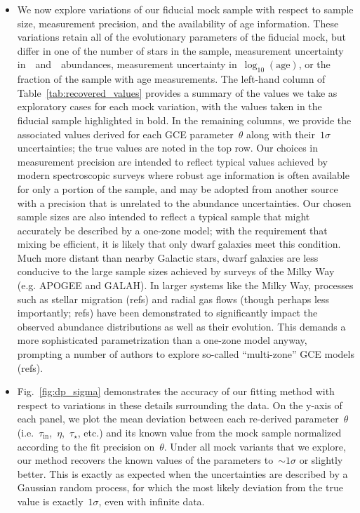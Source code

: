 \documentclass[ms.tex]{subfiles}
\begin{document}
\begin{itemize}

	\item We now explore variations of our fiducial mock sample with respect
	to sample size, measurement precision, and the availability of age
	information.
	These variations retain all of the evolutionary parameters of the fiducial
	mock, but differ in one of the number of stars in the sample, measurement
	uncertainty in~\feh~and~\afe~abundances, measurement uncertainty
	in~$\log_{10}(\text{age})$, or the fraction of the sample with age
	measurements.
	The left-hand column of Table~\ref{tab:recovered_values} provides a summary
	of the values we take as exploratory cases for each mock variation, with
	the values taken in the fiducial sample highlighted in bold.
	In the remaining columns, we provide the associated values derived for each
	GCE parameter~$\theta$ along with their~$1\sigma$ uncertainties; the true
	values are noted in the top row.
	Our choices in measurement precision are intended to reflect typical values
	achieved by modern spectroscopic surveys where robust age information is
	often available for only a portion of the sample, and may be adopted from
	another source with a precision that is unrelated to the abundance
	uncertainties.
	Our chosen sample sizes are also intended to reflect a typical sample that
	might accurately be described by a one-zone model; with the requirement
	that mixing be efficient, it is likely that only dwarf galaxies meet this
	condition.
	Much more distant than nearby Galactic stars, dwarf galaxies are less
	conducive to the large sample sizes achieved by surveys of the Milky Way
	(e.g. APOGEE and GALAH).
	In larger systems like the Milky Way, processes such as stellar migration
	(refs) and radial gas flows (though perhaps less importantly; refs) have
	been demonstrated to significantly impact the observed abundance
	distributions as well as their evolution.
	This demands a more sophisticated parametrization than a one-zone model
	anyway, prompting a number of authors to explore so-called ``multi-zone''
	GCE models (refs).

	\item Fig.~\ref{fig:dp_sigma} demonstrates the accuracy of our fitting
	method with respect to variations in these details surrounding the data.
	On the y-axis of each panel, we plot the mean deviation between each
	re-derived parameter~$\theta$ (i.e.~$\tau_\text{in}$,~$\eta$,~$\tau_\star$,
	etc.) and its known value from the mock sample normalized according to the
	fit precision on~$\theta$.
	Under all mock variants that we explore, our method recovers the known
	values of the parameters to~$\sim1\sigma$ or slightly better.
	This is exactly as expected when the uncertainties are described by a
	Gaussian random process, for which the most likely deviation from the true
	value is exactly~$1\sigma$, even with infinite data.


\end{itemize}
\end{document}
